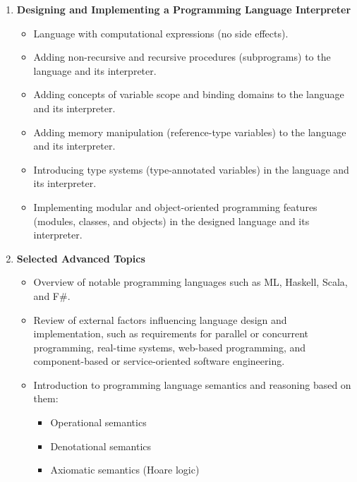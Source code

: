 \documentclass[12pt]{article}
\begin{document}
\begin{enumerate}
    \item \textbf{Designing and Implementing a Programming Language Interpreter}
        \begin{itemize}
            \item Language with computational expressions (no side effects).
            \item Adding non-recursive and recursive procedures (subprograms) to the language and its interpreter.
            \item Adding concepts of variable scope and binding domains to the language and its interpreter.
            \item Adding memory manipulation (reference-type variables) to the language and its interpreter.
            \item Introducing type systems (type-annotated variables) in the language and its interpreter.
            \item Implementing modular and object-oriented programming features (modules, classes, and objects) in the designed language and its interpreter.
        \end{itemize}
    
    \item \textbf{Selected Advanced Topics}
        \begin{itemize}
            \item Overview of notable programming languages such as ML, Haskell, Scala, and F\#.
            \item Review of external factors influencing language design and implementation, such as requirements for parallel or concurrent programming, real-time systems, web-based programming, and component-based or service-oriented software engineering.
            \item Introduction to programming language semantics and reasoning based on them:
                \begin{itemize}
                    \item Operational semantics
                    \item Denotational semantics
                    \item Axiomatic semantics (Hoare logic)
                \end{itemize}
        \end{itemize}
\end{enumerate}
\end{document}
